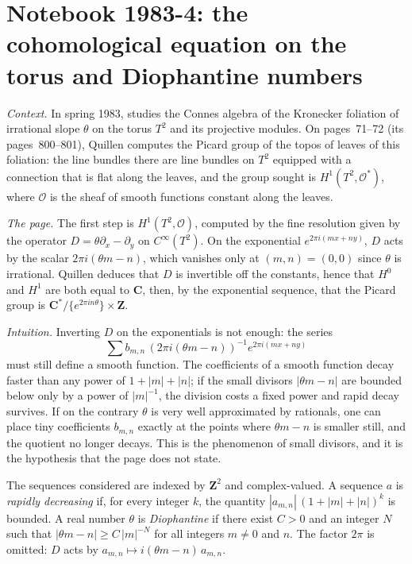\section[Notebook 1983-4: the cohomological equation on the torus]{Notebook 1983-4: the cohomological equation on the torus and Diophantine numbers\protect{}}\label{sec:quillen-1983-4}

\emph{Context.} In spring 1983,  studies the Connes algebra of the Kronecker foliation of irrational slope $\theta$ on the torus $T^2$ and its projective modules. On pages~71--72 (its pages~800--801), Quillen computes the Picard group of the topos of leaves of this foliation: the line bundles there are line bundles on $T^2$ equipped with a connection that is flat along the leaves, and the group sought is $H^1(T^2, \mathcal O^*)$, where $\mathcal O$ is the sheaf of smooth functions constant along the leaves.

\emph{The page.} The first step is $H^1(T^2, \mathcal O)$, computed by the fine resolution given by the operator $D = \theta\partial_x - \partial_y$ on $C^\infty(T^2)$. On the exponential $e^{2\pi i(mx + ny)}$, $D$ acts by the scalar $2\pi i(\theta m - n)$, which vanishes only at $(m, n) = (0, 0)$ since $\theta$ is irrational. Quillen deduces that $D$ is invertible off the constants, hence that $H^0$ and $H^1$ are both equal to $\mathbf C$, then, by the exponential sequence, that the Picard group is $\mathbf C^*/\{e^{2\pi i n\theta}\} \times \mathbf Z$.

\emph{Intuition.} Inverting $D$ on the exponentials is not enough: the series \[\sum b_{m,n}\,(2\pi i(\theta m - n))^{-1} e^{2\pi i(mx+ny)}\] must still define a smooth function. The coefficients of a smooth function decay faster than any power of $1 + |m| + |n|$; if the small divisors $|\theta m - n|$ are bounded below only by a power of $|m|^{-1}$, the division costs a fixed power and rapid decay survives. If on the contrary $\theta$ is very well approximated by rationals, one can place tiny coefficients $b_{m,n}$ exactly at the points where $\theta m - n$ is smaller still, and the quotient no longer decays. This is the phenomenon of small divisors, and it is the hypothesis that the page does not state.

\begin{enonce}
The sequences considered are indexed by $\mathbf Z^2$ and complex-valued. A sequence $a$ is \emph{rapidly decreasing} if, for every integer $k$, the quantity $|a_{m,n}|\,(1 + |m| + |n|)^k$ is bounded. A real number $\theta$ is \emph{Diophantine} if there exist $C > 0$ and an integer $N$ such that $|\theta m - n| \ge C\,|m|^{-N}$ for all integers $m \ne 0$ and $n$. The factor $2\pi$ is omitted: $D$ acts by $a_{m,n} \mapsto i(\theta m - n)\,a_{m,n}$.
\end{enonce}

